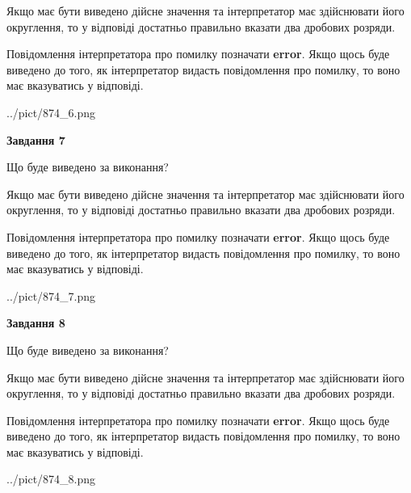 \documentclass[12pt, ukrainian]{article}
\begin{document}
{\begin {Large}
Якщо має бути виведено дійсне значення та інтерпретатор має здійснювати його округлення, 
то у відповіді достатньо правильно вказати два дробових розряди.

Повідомлення інтерпретатора про помилку позначати \textbf{error}.
Якщо щось буде виведено до того, як інтерпретатор видасть повідомлення про помилку, 
то воно має вказуватись у відповіді. \par

\begin{center}
	{../pict/874_6.png}
\end{center}
\newpage

{\begin {center}\textbf{Завдання 7}\end {center}}\par
Що буде виведено за виконання? \par

Якщо має бути виведено дійсне значення та інтерпретатор має здійснювати його округлення, 
то у відповіді достатньо правильно вказати два дробових розряди.

Повідомлення інтерпретатора про помилку позначати \textbf{error}.
Якщо щось буде виведено до того, як інтерпретатор видасть повідомлення про помилку, 
то воно має вказуватись у відповіді. \par

\begin{center}
	{../pict/874_7.png}
\end{center}
\newpage

{\begin {center}\textbf{Завдання 8}\end {center}}\par
Що буде виведено за виконання? \par

Якщо має бути виведено дійсне значення та інтерпретатор має здійснювати його округлення, 
то у відповіді достатньо правильно вказати два дробових розряди.

Повідомлення інтерпретатора про помилку позначати \textbf{error}.
Якщо щось буде виведено до того, як інтерпретатор видасть повідомлення про помилку, 
то воно має вказуватись у відповіді. \par

\begin{center}
	{../pict/874_8.png}
\end{center}
\newpage


\end{Large}}
\end{document}
